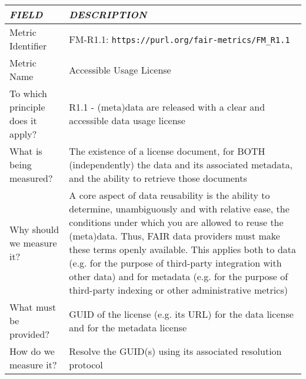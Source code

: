 \documentclass[english]{article}
\begin{document}
\begin{longtable}{|p{5cm}|p{9cm}|}


\hline
\emph{FIELD} & \emph{DESCRIPTION} \\
\hline
Metric Identifier &   FM-R1.1: \verb"https://purl.org/fair-metrics/FM_R1.1"
\\


\hline
Metric Name &   

Accessible Usage License


 \\



\hline
To which principle does it apply? &   



R1.1 - (meta)data are released with a clear and accessible data usage license

\\



\hline
What is being measured? & 

The existence of a license document, for BOTH (independently) the data and its associated metadata, and the ability to retrieve those documents


\\



\hline
Why should we measure it? & 


A core aspect of data reusability is the ability to determine, unambiguously and with relative ease, the conditions under which you are allowed to reuse the (meta)data.  Thus, FAIR data providers must make these terms openly available.  This applies both to data (e.g. for the purpose of third-party integration with other data) and for metadata (e.g. for the purpose of third-party indexing or other administrative metrics)

  
\\



\hline
What must be provided? &  


GUID of the license (e.g. its URL) for the data license and for the metadata license

\\



\hline
How do we measure it? &  

Resolve the GUID(s) using its associated resolution protocol




\end{longtable}
\end{document}
